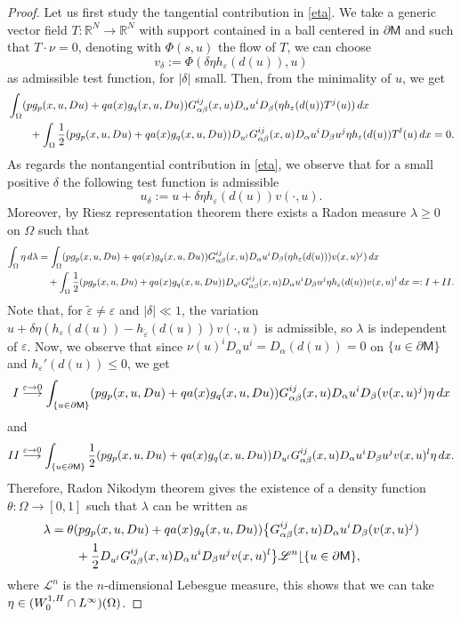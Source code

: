 \documentclass[10pt,a4paper]{amsart}
\theoremstyle{plain}
\theoremstyle{definition}
\theoremstyle{remark}
\newcommand{\R}{\mathbb{R}}
\newcommand{\mm}{\mathsf{M}}
\newcommand{\tx}[1]{\textnormal{\texttt{#1}}}
\def\d{\,{\rm d}}
\def\dx{\,{\rm d}x}
\begin{document}
\begin{proof}
Let us first study the tangential contribution in \eqref{eta}. We take a generic vector field $ T : \R^N \to \R^N$ with support contained in a ball centered in $\partial \mm$ and such that $T \cdot \nu =0$, denoting with $\Phi(s,u)$ the flow of $T$, we can choose $$v_\delta := \Phi(\delta\eta h_\varepsilon(d(u)),u)$$ as admissible test function, for  $|\delta|$ small. Then, from the minimality of $u$, we get
\begin{align} \label{eq2}
    & \int_\Omega (pg_p(x,u,Du) + qa(x)g_q(x,u,Du))G^{ij}_{\alpha  \beta}(x,u)D_\alpha  u^i D_\beta (\eta h_\varepsilon (d(u))T^j(u)) \dx \notag \\ & \qquad + \int_{\Omega} \frac{1}{2} (pg_p(x,u,Du) + qa(x)g_q(x,u,Du)) D_{u^l} G^{ij}_{\alpha \beta} (x,u) D_\alpha u^i D_\beta u^j \eta h_\varepsilon (d(u)) T^l(u) \dx =0.
\end{align}
As regards the nontangential contribution in \eqref{eta}, we observe that for a small positive $\delta$ the following test function  is admissible
$$ u_\delta := u + \delta\eta h_\varepsilon(d(u))v(\cdot,u).$$
Moreover, by Riesz representation theorem there exists a Radon measure $\lambda  \geq 0$ on $\Omega$ such that
\begin{align} \label{eq1}
    \int_\Omega  \eta \d\lambda &= \int_{\Omega} (p g_p(x,u,Du)+ qa(x) g_q(x,u,Du)) G^{ij}_{\alpha \beta}(x,u)D_{\alpha}u^i D_\beta(\eta h_\varepsilon(d(u)))v(x,u)^j) \dx  \notag \\ & \quad + \int_{\Omega}\frac{1}{2}(p g_p(x,u,Du)+ qa(x) g_q(x,u,Du))D_{u^l} G^{ij}_{\alpha \beta} (x,u)D_\alpha u^i D_\beta u^j \eta h_\varepsilon (d(u)) v(x,u)^l \dx =: \tx{I} + \tx{II}.
\end{align}
Note that, for $\tilde{\varepsilon} \neq \varepsilon$ and $|\delta| \ll 1$, the variation $u+\delta\eta(h_\varepsilon (d(u))- h_{\tilde{\varepsilon}}(d(u)))v(\cdot,u)$ is  admissible,  so $\lambda$  is independent of $\varepsilon$. Now, we  observe that since $\nu(u)^i D_\alpha u^i = D_\alpha (d(u)) =0$ on $\{ u \in \partial \mm \}$ and $h_\varepsilon '(d(u)) \leq 0$, we get
$$ \tx{I} \overset{\varepsilon \to 0}{\longrightarrow} \int_{\{ u \in \partial \mm \}} (pg_p(x,u,Du)+qa(x)g_q(x,u,Du)) G^{ij}_{\alpha \beta}(x,u) D_\alpha u^i D_\beta (v(x,u)^j) \eta \dx$$
and
$$ \tx{II} \overset{\varepsilon \to 0}{\longrightarrow}  \int_{\{ u \in \partial \mm\} } \frac{1}{2}(pg_p(x,u,Du) + qa(x)g_q(x,u,Du)) D_{u^l}G^{ij}_{\alpha \beta}(x,u) D_\alpha u^i D_\beta u^j v(x,u)^l \eta \dx.$$
Therefore, Radon Nikodym theorem gives the existence of a density function $\theta: \Omega \to [0,1]$ such that $\lambda$ can be written as
\begin{align} \label{lambda}
    \lambda & =  \theta (pg_p(x,u,Du)+qa(x)g_q(x,u,Du)) \big \{ G^{ij}_{\alpha \beta} (x,u) D_\alpha u^i D_\beta (v(x,u)^j) \notag \\ & \qquad + \frac{1}{2}D_{u^l}G^{ij}_{\alpha \beta}(x,u)D_\alpha u^i D_\beta u^j v(x,u)^l \big \} \mathscr{L}^n \lfloor \{ u \in \partial \mm\},
\end{align}
where $\mathscr{L}^n$ is the $n$-dimensional Lebesgue measure, this shows that we can take $\eta \in (W^{1,\tx{H}}_0 \cap L^\infty)(\Omega)$.



\end{proof}
\end{document}
